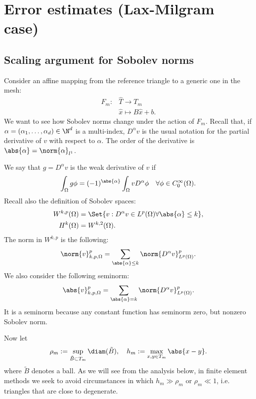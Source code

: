 
\chapter[Error estimates (Lax-Milgram case)]{Error estimates (Lax-Milgram case)}

\section{Scaling argument for Sobolev norms}


Consider an affine mapping from the reference triangle to a generic one in the mesh:
\begin{align}
F_m: &\hat{T} \to T_m \\
&\hat{x} \mapsto B \hat{x} + b.
\end{align}
We want to see how Sobolev norms change under the action of $F_m$. Recall that, if $\alpha = (\alpha_1, \dots, \alpha_d) \in \N^d$ is a multi-index, $D^\alpha v$ is the usual notation for the partial derivative of $v$ with respect to $\alpha$. The order of the derivative is $\abs{\alpha} = \norm{\alpha}_{l^1}$.

We say that $g = D^\alpha v$ is the weak derivative of $v$ if
\[
\int_\Omega g \phi = (-1)^{\abs{\alpha}} \int_\Omega v D^\alpha \phi \quad \forall \phi \in C^\infty_0(\Omega).
\]
Recall also the definition of Sobolev spaces:
\begin{align}
W^{k,p}(\Omega) &= \Set{v : D^\alpha v \in L^p(\Omega)  \forall \abs{\alpha} \le k}, \\
H^k(\Omega) &= W^{k,2}(\Omega).
\end{align}
The norm in $W^{k,p}$ is the following:
\[
\norm{v}^p_{k,p,\Omega} = \sum_{\abs{\alpha} \le k} \norm{D^\alpha v}^p_{L^p(\Omega)}.
\]
We also consider the following seminorm:
\[
\abs{v}^p_{k,p,\Omega} = \sum_{\abs{\alpha} = k} \norm{D^\alpha v}^p_{L^p(\Omega)}.
\]
It is a seminorm because any constant function has seminorm zero, but nonzero Sobolev norm.

Now let
\[
\rho_m := \sup_{\tilde{B} \subset T_m} \diam(\tilde{B}), \quad h_m := \max_{x,y \in T_m} \abs{x-y}.
\]
where $\tilde{B}$ denotes a ball.
As we will see from the analysis below, in finite element methods we seek to avoid circumstances in which $h_m \gg \rho_m$ or $\rho_m \ll 1$, i.e. triangles that are close to degenerate.


